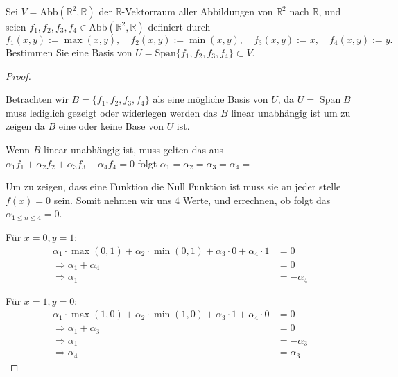 \documentclass{../problemset}
\begin{document}
\begin{problem}
Sei $V = \text{Abb}(\mathbb{R}^2, \mathbb{R})$ der $\mathbb{R}$-Vektorraum aller Abbildungen von $\mathbb{R}^2$ nach $\mathbb{R}$, und seien $f_1, f_2, f_3, f_4 \in \text{Abb}(\mathbb{R}^2, \mathbb{R})$ definiert durch
\[ f_1(x, y) := \max(x, y), \quad f_2(x, y) := \min(x, y), \quad f_3(x, y) := x, \quad f_4(x, y) := y. \]
Bestimmen Sie eine Basis von $U = \text{Span}\{f_1, f_2, f_3, f_4\} \subset V$.
\begin{proof}
	$ $

    Betrachten wir $B = \{f_1, f_2, f_3, f_4\}$ als eine mögliche Basis von $U$, da $U = \operatorname{Span} B$ muss lediglich gezeigt oder widerlegen werden das $B$ linear unabhängig ist um zu zeigen da $B$ eine oder keine Base von $U$ ist.

    Wenn $B$ linear unabhängig ist, muss gelten das aus $\alpha_1 f_1 + \alpha_2 f_2 + \alpha_3 f_3 + \alpha_4 f_4 = 0$ folgt $\alpha_1 = \alpha_2 = \alpha_3 = \alpha_4 = $

    Um zu zeigen, dass eine Funktion die Null Funktion ist muss sie an jeder stelle $f(x) = 0$ sein.
    Somit nehmen wir uns 4 Werte, und errechnen, ob folgt das $\alpha_{1 \le n \le 4} = 0$.

    Für $x = 0, y = 1$:
    \begin{align*}
        \alpha_1 \cdot \max(0, 1) + \alpha_2 \cdot \min(0, 1) + \alpha_3 \cdot 0 + \alpha_4 \cdot 1 & = 0         \\
        \Rightarrow \alpha_1 + \alpha_4                                                             & = 0         \\
        \Rightarrow \alpha_1                                                                        & = -\alpha_4
    \end{align*}

    Für $x = 1, y = 0$:
    \begin{align*}
        \alpha_1 \cdot \max(1, 0) + \alpha_2 \cdot \min(1, 0) + \alpha_3 \cdot 1 + \alpha_4 \cdot 0 & = 0         \\
        \Rightarrow \alpha_1 + \alpha_3                                                             & = 0         \\
        \Rightarrow \alpha_1                                                                        & = -\alpha_3 \\
        \Rightarrow \alpha_4                                                                        & = \alpha_3
    \end{align*}


\end{proof}
\end{problem}
\end{document}
